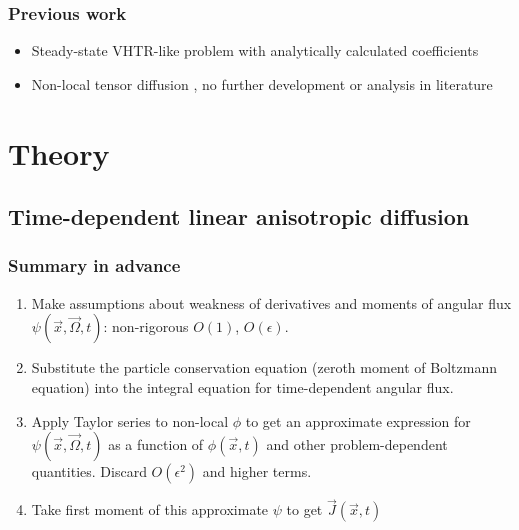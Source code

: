 \documentclass{beamer}
\begin{document}
\begin{frame}
  \frametitle{Previous work}
  \begin{itemize}
    \item Steady-state VHTR-like problem with analytically calculated
      coefficients \cite{Lar2009c}
    \item Non-local tensor diffusion \cite{Mor2007}, no further development or
      analysis in literature
  \end{itemize}
\end{frame}
\section{Theory}
\subsection{Time-dependent linear anisotropic diffusion}
\begin{frame}
  \frametitle{Summary in advance}
  \begin{enumerate}
    \item Make assumptions about weakness of derivatives and moments of angular
      flux $\psi(\vec{x}, \vec{\Omega}, t)$: non-rigorous $O(1)$, $O(\epsilon)$.
    \item Substitute the particle conservation equation (zeroth moment of
      Boltzmann equation) into the integral equation for time-dependent angular
      flux.
    \item Apply Taylor series to non-local $\phi$ to get an approximate
      expression for $\psi(\vec{x}, \vec{\Omega}, t)$ as a function of
      $\phi(\vec{x}, t)$ and other problem-dependent quantities.
      Discard $O(\epsilon^2)$ and higher terms.
    \item Take first moment of this approximate $\psi$ to get
      $\vec{J}(\vec{x}, t)$
  \end{enumerate}
\end{frame}
\end{document}
